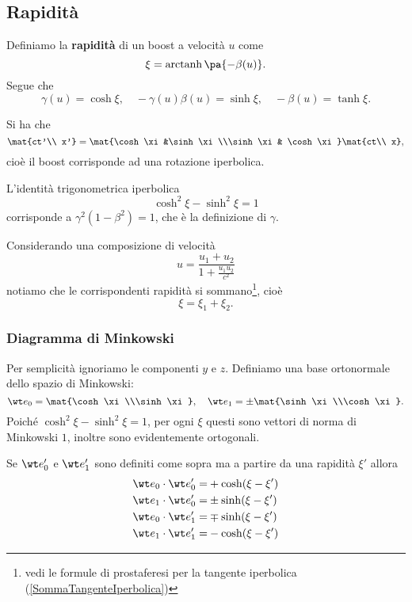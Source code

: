 \subsection{Rapidit\`a}

\begin{definition}[Rapidit\`a]
Definiamo la \textbf{rapidit\`a} di un boost a velocit\`a $u$ come
\[\xi=\arctanh\pa{-\beta(u)}.\]
Segue che
\[\gamma(u)=\cosh\xi,\quad -\gamma(u)\beta(u)=\sinh\xi,\quad -\beta(u)=\tanh \xi.\]
\end{definition}
\begin{remark}
Si ha che
\[\mat{ct'\\ x'}=\mat{\cosh \xi &\sinh \xi\\\sinh \xi & \cosh \xi}\mat{ct\\ x},\]
cio\`e il boost corrisponde ad una rotazione iperbolica.
\end{remark}
\begin{remark}
L'identit\`a trigonometrica iperbolica
\[\cosh^2\xi-\sinh^2\xi=1\]
corrisponde a $\gamma^2(1-\beta^2)=1$, che \`e la definizione di $\gamma$.
\end{remark}


\begin{remark}
Considerando una composizione di velocit\`a 
\[u=\dfrac{u_1+u_2}{1+\frac{u_1u_2}{c^2}}\]
notiamo che le corrispondenti rapidit\`a si sommano\footnote{vedi le formule di prostaferesi per la tangente iperbolica (\ref{SommaTangenteIperbolica})}, cio\`e
\[\xi=\xi_1+\xi_2.\]
\end{remark}


\subsubsection{Diagramma di Minkowski}
Per semplicit\`a ignoriamo le componenti $y$ e $z$. Definiamo una base ortonormale dello spazio di Minkowski:
\[\wt e_0=\mat{\cosh \xi\\\sinh\xi},\quad \wt e_1=\pm \mat{\sinh \xi\\\cosh\xi}.\]
Poich\'e $\cosh^2\xi-\sinh^2\xi=1$, per ogni $\xi$ questi sono vettori di norma di Minkowski $1$, inoltre sono evidentemente ortogonali.
\bigskip

\noindent
Se $\wt e_0'$ e $\wt e_1'$ sono definiti come sopra ma a partire da una rapidit\`a $\xi'$ allora
\begin{align*}
\wt e_0\cdot \wt e_0'=&+\cosh(\xi-\xi')\\
\wt e_1\cdot \wt e_0'=&\pm \sinh(\xi-\xi')\\
\wt e_0\cdot \wt e_1'=&\mp\sinh(\xi-\xi')\\
\wt e_1\cdot \wt e_1'=&-\cosh(\xi-\xi')
\end{align*}


